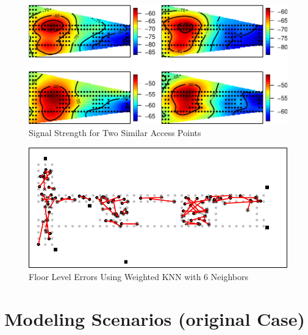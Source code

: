 \documentclass[
]{article}
\begin{document}
\begin{figure}[H]

{\centering \includegraphics{msds7333_case_study01_files/figure-latex/unnamed-chunk-8-1} 

}

\caption{Signal Strength for Two Similar Access Points}\label{fig:unnamed-chunk-8}
\end{figure}

\begin{figure}[H]

{\centering \includegraphics{msds7333_case_study01_files/figure-latex/unnamed-chunk-10-1} 

}

\caption{Floor Level Errors Using Weighted KNN with 6 Neighbors}\label{fig:unnamed-chunk-10}
\end{figure}

\newpage

\hypertarget{modeling-scenarios-original-case}{%
\section{Modeling Scenarios (original
Case)}\label{modeling-scenarios-original-case}}
\end{document}
